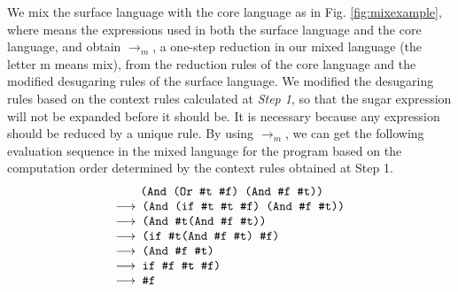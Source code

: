 We mix the surface language with the core language as in Fig. \ref{fig:mixexample}, where  means the expressions used in both the surface language and the core language, and obtain $\to_m$, a one-step reduction in our mixed language (the letter m means mix), from the reduction rules of the core language and the modified desugaring rules of the surface language. We modified the desugaring rules based on the context rules calculated at {\em Step 1}, so that the sugar expression will not be expanded before it should be. It is necessary because any expression should be reduced by a unique rule. By using $\to_m$, we can get the following evaluation sequence in the mixed language for
the program  based on the computation order determined by the context rules obtained at Step 1.
\[
    \begin{array}{l}
        \qquad\Code{(And (Or \true~\false) (And \false~\true))}\\
        \OneStep{ \Code{ (And (if \true~\true~\false) (And \false~\true))}}\\
        \OneStep{\Code{ (And \true (And \false~\true))}}\\
        \OneStep{\Code{ (if \true (And \false~\true) \false)}}\\
        \OneStep{\Code{ (And \false~\true)}}\\
        \OneStep{\Code{ if \false~\true~\false)}}\\
        \OneStep{\Code{ \false}}\\
    \end{array}
\]
    



